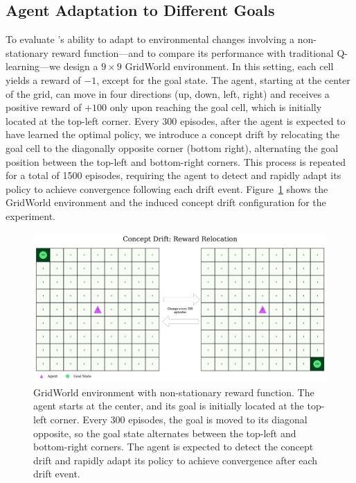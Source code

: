 \subsection{Agent Adaptation to Different Goals}
\label{sec:experiments}

To evaluate \adaptiverl's ability to adapt to environmental changes involving a non-stationary reward function—and to compare its performance with traditional Q-learning—we design a $9\times 9$ GridWorld environment. In this setting, each cell yields a reward of $-1$, except for the goal state. The agent, starting at the center of the grid, can move in four directions (up, down, left, right) and receives a positive reward of $+100$ only upon reaching the goal cell, which is initially located at the top-left corner. Every 300 episodes, after the agent is expected to have learned the optimal policy, we introduce a concept drift by relocating the goal cell to the diagonally opposite corner (bottom right), alternating the goal position between the top-left and bottom-right corners. This process is repeated for a total of 1500 episodes, requiring the agent to detect and rapidly adapt its policy to achieve convergence following each drift event. Figure~\ref{fig:r-change} shows the GridWorld environment and the induced concept drift configuration for the experiment.

\begin{figure}
    \centering
    \includegraphics[width=\textwidth]{figures/r_change.png}
    \caption{GridWorld environment with non-stationary reward function. The agent starts at the center, and its goal is initially located at the top-left corner. Every 300 episodes, the goal is moved to its diagonal opposite, so the goal state alternates between the top-left and bottom-right corners. The agent is expected to detect the concept drift and rapidly adapt its policy to achieve convergence after each drift event.}
    \label{fig:r-change}
\end{figure}


